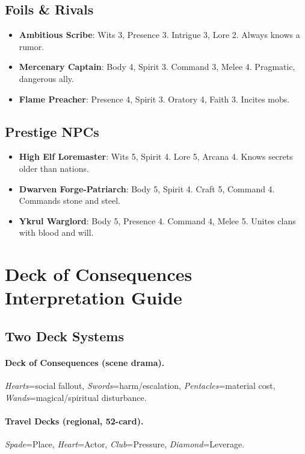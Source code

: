 \subsection*{Foils \& Rivals}

\begin{itemize}
    \item \textbf{Ambitious Scribe}: Wits 3, Presence 3. Intrigue 3, Lore 2. Always knows a rumor.
    \item \textbf{Mercenary Captain}: Body 4, Spirit 3. Command 3, Melee 4. Pragmatic, dangerous ally.
    \item \textbf{Flame Preacher}: Presence 4, Spirit 3. Oratory 4, Faith 3. Incites mobs.
\end{itemize}

\subsection*{Prestige NPCs}

\begin{itemize}
    \item \textbf{High Elf Loremaster}: Wits 5, Spirit 4. Lore 5, Arcana 4. Knows secrets older than nations.
    \item \textbf{Dwarven Forge-Patriarch}: Body 5, Spirit 4. Craft 5, Command 4. Commands stone and steel.
    \item \textbf{Ykrul Warglord}: Body 5, Presence 4. Command 4, Melee 5. Unites clans with blood and will.
\end{itemize}

\section*{Deck of Consequences Interpretation Guide}

\subsection*{Two Deck Systems}

\paragraph{Deck of Consequences (scene drama).}
\emph{Hearts}=social fallout, \emph{Swords}=harm/escalation, \emph{Pentacles}=material cost, \emph{Wands}=magical/spiritual disturbance.

\paragraph{Travel Decks (regional, 52-card).}
\emph{Spade}=Place, \emph{Heart}=Actor, \emph{Club}=Pressure, \emph{Diamond}=Leverage.

